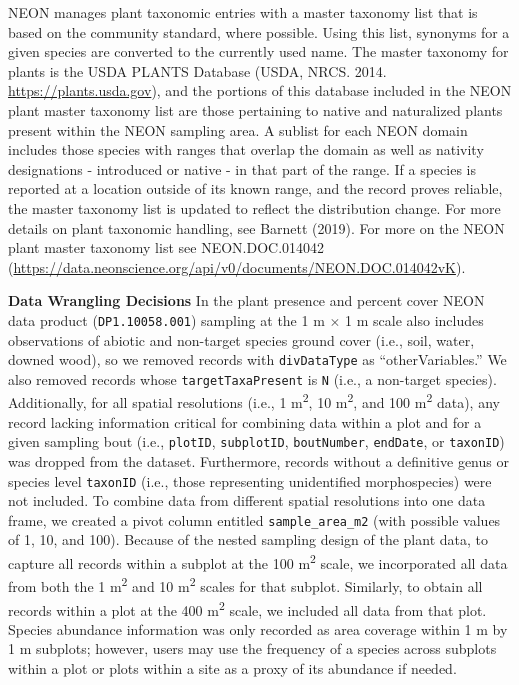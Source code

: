 \documentclass[
  12pt,
]{article}
\begin{document}
NEON manages plant taxonomic entries with a master taxonomy list that is based on the community standard, where possible. Using this list, synonyms for a given species are converted to the currently used name. The master taxonomy for plants is the USDA PLANTS Database (USDA, NRCS. 2014. \url{https://plants.usda.gov}), and the portions of this database included in the NEON plant master taxonomy list are those pertaining to native and naturalized plants present within the NEON sampling area. A sublist for each NEON domain includes those species with ranges that overlap the domain as well as nativity designations - introduced or native - in that part of the range. If a species is reported at a location outside of its known range, and the record proves reliable, the master taxonomy list is updated to reflect the distribution change. For more details on plant taxonomic handling, see Barnett (2019). For more on the NEON plant master taxonomy list see NEON.DOC.014042 (\url{https://data.neonscience.org/api/v0/documents/NEON.DOC.014042vK}).

\textbf{Data Wrangling Decisions} In the plant presence and percent cover NEON data product (\texttt{DP1.10058.001}) sampling at the 1 m \(\times\) 1 m scale also includes observations of abiotic and non-target species ground cover (i.e., soil, water, downed wood), so we removed records with \texttt{divDataType} as ``otherVariables.'' We also removed records whose \texttt{targetTaxaPresent} is \texttt{N} (i.e., a non-target species). Additionally, for all spatial resolutions (i.e., 1 m\textsuperscript{2}, 10 m\textsuperscript{2}, and 100 m\textsuperscript{2} data), any record lacking information critical for combining data within a plot and for a given sampling bout (i.e., \texttt{plotID}, \texttt{subplotID}, \texttt{boutNumber}, \texttt{endDate}, or \texttt{taxonID}) was dropped from the dataset. Furthermore, records without a definitive genus or species level \texttt{taxonID} (i.e., those representing unidentified morphospecies) were not included. To combine data from different spatial resolutions into one data frame, we created a pivot column entitled \texttt{sample\_area\_m2} (with possible values of 1, 10, and 100). Because of the nested sampling design of the plant data, to capture all records within a subplot at the 100 m\textsuperscript{2} scale, we incorporated all data from both the 1 m\textsuperscript{2} and 10 m\textsuperscript{2} scales for that subplot. Similarly, to obtain all records within a plot at the 400 m\textsuperscript{2} scale, we included all data from that plot. Species abundance information was only recorded as area coverage within 1 m by 1 m subplots; however, users may use the frequency of a species across subplots within a plot or plots within a site as a proxy of its abundance if needed.
\end{document}
